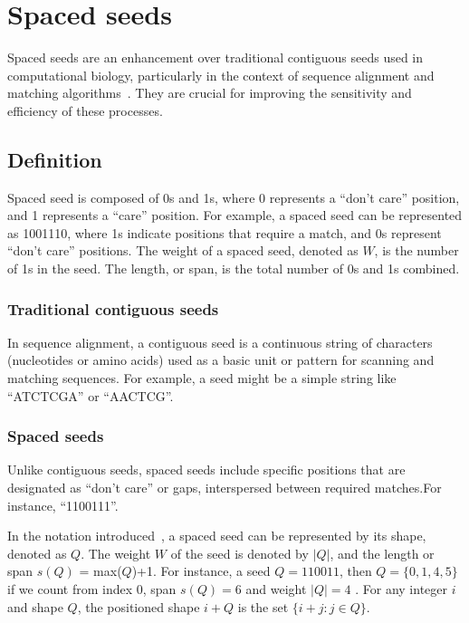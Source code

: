 \documentclass[PhD]{PHlab-thesis}
\begin{document}
\section{Spaced seeds}
Spaced seeds are an enhancement over traditional contiguous seeds used in computational biology, particularly in the context of sequence alignment and matching algorithms~\cite{BestHitsOf11101}. They are crucial for improving the sensitivity and efficiency of these processes.
\subsection{Definition}
Spaced seed is composed of 0s and 1s, where 0 represents a ``don't care'' position, and 1 represents a ``care'' position. For example, a spaced seed can be represented as 1001110, where 1s indicate positions that require a match, and 0s represent ``don't care'' positions. The weight of a spaced seed, denoted as $W$, is the number of 1s in the seed. The length, or span, is the total number of 0s and 1s combined. 

\subsubsection{Traditional contiguous seeds}
In sequence alignment, a contiguous seed is a continuous string of characters (nucleotides or amino acids) used as a basic unit or pattern for scanning and matching sequences. For example, a seed might be a simple string like ``ATCTCGA'' or ``AACTCG''.

\subsubsection{Spaced seeds}
Unlike contiguous seeds, spaced seeds include specific positions that are designated as ``don't care'' or gaps, interspersed between required matches.For instance, ``1100111''.
\vspace{3em}

In the notation introduced~\cite{SensSpacedSeed}, a spaced seed can be represented by its shape, denoted as $Q$. The weight $W$ of the seed is denoted by $\left | Q \right |$, and the length or span $s(Q)$ = max($Q$)+1. For instance, a seed $Q=110011$, then $Q=\{0, 1, 4, 5\}$ if we count from index 0, span $s(Q)=6$ and weight $\left | Q \right | = 4$ . For any integer $i$ and shape $Q$, the positioned shape $i+Q$ is the set $\{i+j:j\in Q\}$.
\vspace{2em}
\end{document}
